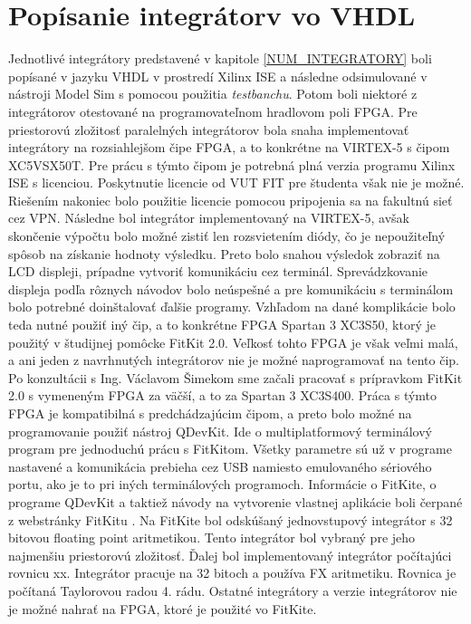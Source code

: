 \chapter{Popísanie integrátorv vo VHDL} \label{IMPLEMENTACIA}
Jednotlivé integrátory predstavené v kapitole \ref{NUM_INTEGRATORY} boli popísané v jazyku VHDL v prostredí Xilinx ISE a následne odsimulované v nástroji Model Sim s pomocou použitia \textit{testbanchu}. Potom boli niektoré z integrátorov otestované na programovateľnom hradlovom poli FPGA.
Pre priestorovú zložitosť paralelných integrátorov bola snaha implementovať integrátory na rozsiahlejšom čipe FPGA, a to konkrétne na VIRTEX-5 s čipom XC5VSX50T. Pre prácu s týmto čipom je potrebná plná verzia programu Xilinx ISE s licenciou. Poskytnutie licencie od VUT FIT pre študenta však nie je možné. Riešením nakoniec bolo použitie licencie pomocou pripojenia sa na fakultnú sieť cez VPN. Následne bol integrátor implementovaný na VIRTEX-5, avšak skončenie výpočtu bolo možné zistiť len rozsvietením diódy, čo je nepoužiteľný spôsob na získanie hodnoty výsledku. Preto bolo snahou výsledok zobraziť na LCD displeji, prípadne vytvoriť komunikáciu cez terminál. Sprevádzkovanie displeja podľa rôznych návodov bolo neúspešné a pre komunikáciu s terminálom bolo potrebné doinštalovať ďalšie programy. Vzhľadom na dané komplikácie bolo teda nutné použiť iný čip, a to konkrétne FPGA Spartan 3 XC3S50, ktorý je použitý v študijnej pomôcke FitKit 2.0. Veľkosť tohto FPGA je však veľmi malá, a ani jeden z navrhnutých integrátorov nie je možné naprogramovať na tento čip. Po konzultácii s Ing. Václavom Šimekom sme začali pracovať s prípravkom FitKit 2.0 s vymeneným FPGA za väčší, a to za Spartan 3 XC3S400. Práca s týmto FPGA je kompatibilná s predchádzajúcim čipom, a preto bolo možné na programovanie použiť nástroj QDevKit. Ide o multiplatformový terminálový program pre jednoduchú prácu s FitKitom. Všetky parametre sú už v programe nastavené a komunikácia prebieha cez USB namiesto emulovaného sériového portu, ako je to pri iných terminálových programoch. Informácie o FitKite, o programe QDevKit a taktiež návody na vytvorenie vlastnej aplikácie boli čerpané z webstránky FitKitu \cite{fitkit}.
Na FitKite bol odskúšaný jednovstupový integrátor s 32 bitovou floating point aritmetikou. Tento integrátor bol vybraný pre jeho najmenšiu priestorovú zložitosť. Ďalej bol implementovaný integrátor počítajúci rovnicu xx. Integrátor pracuje na 32 bitoch a používa FX aritmetiku. Rovnica je počítaná Taylorovou radou 4. rádu. Ostatné integrátory a verzie integrátorov nie je možné nahrať na FPGA, ktoré je použité vo FitKite.

